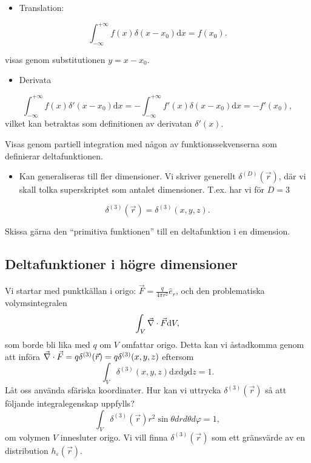 \documentclass[%
oneside,                 %
final,                   %
10pt]{article}
\newenvironment{warning_mdfboxadmon}[1][]{
\begin{warning_mdfboxmdframed}[frametitle=#1]
}
{
\end{warning_mdfboxmdframed}
}
\begin{document}
\begin{itemize}
\item Translation: 
\end{itemize}

\noindent
$$
\int_{-\infty}^{+\infty} f(x) \delta(x-x_0) \mbox{d}x = f(x_0).
$$

\begin{warning_mdfboxadmon}[Kommentar]
visas genom substitutionen $y=x-x_0$.
\end{warning_mdfboxadmon} %


\begin{itemize}
\item Derivata 
\end{itemize}

\noindent
$$
\int_{-\infty}^{+\infty} f(x) \delta'(x-x_0) \mbox{d}x = -\int_{-\infty}^{+\infty} f'(x) \delta(x-x_0) \mbox{d}x = -f'(x_0),
$$
vilket kan betraktas som definitionen av derivatan $\delta'(x)$.


\begin{warning_mdfboxadmon}[Kommentar]
Visas genom partiell integration med någon av funktionssekvenserna som definierar deltafunktionen.
\end{warning_mdfboxadmon} %


\begin{itemize}
\item Kan generaliseras till fler dimensioner. Vi skriver generellt $\delta^{(D)}(\vec{r})$, där vi skall tolka superskriptet som antalet dimensioner. T.ex. har vi för $D=3$ 
\end{itemize}

\noindent
$$
\delta^{(3)}(\vec{r}) = \delta^{(3)}(x,y,z).
$$


\begin{warning_mdfboxadmon}[Rita]
Skissa gärna den ``primitiva funktionen'' till en deltafunktion i en dimension.
\end{warning_mdfboxadmon} %



\subsection*{Deltafunktioner i högre dimensioner}

Vi startar med punktkällan i origo: $\vec{F} = \frac{q}{4 \pi r^2} \hat{e}_r$, och den problematiska volymsintegralen
$$
\int_V \vec{\nabla} \cdot \vec{F} \mbox{d}V,
$$
som borde bli lika med $q$ om $V$ omfattar origo. Detta kan vi åstadkomma genom att införa $\vec{\nabla} \cdot \vec{F} = q \delta^{(3)}(\vec{r}) = q \delta^{(3)}(x,y,z)$ eftersom
$$
\int_V \delta^{(3)}(x,y,z) \mbox{d}x \mbox{d}y \mbox{d}z = 1.
$$
Låt oss använda sfäriska koordinater. Hur kan vi uttrycka $\delta^{(3)}(\vec{r})$ så att följande integralegenskap uppfylls?
$$
\int_V \delta^{(3)}(\vec{r}) r^2 \sin\theta dr d\theta d\varphi = 1,
$$
om volymen $V$ innesluter origo. Vi vill finna $\delta^{(3)}(\vec{r})$ som ett gränsvärde av en distribution $h_\varepsilon(\vec{r})$.
\end{document}
